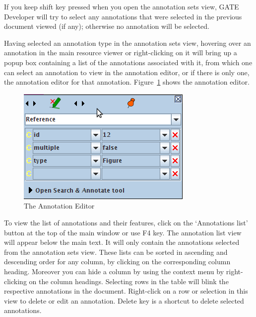 If you keep shift key pressed when you open the annotation sets view, GATE
Developer will try to select any annotations that were selected in the previous
document viewed (if any); otherwise no annotation will be selected.

Having selected an annotation type in the annotation sets view, hovering over an
annotation in the main resource viewer or right-clicking on it will bring up a
popup box containing a list of the annotations associated with it, from which
one can select an annotation to view in the annotation editor, or if there is
only one, the annotation editor for that annotation.
Figure~\ref{fig:annotations-editor} shows the annotation editor.

\begin{figure}[htb]
\begin{center}
\includegraphics[scale=2]{annotations-editor.png}
\end{center}
\caption{The Annotation Editor}
\label{fig:annotations-editor}
\end{figure}



To view the list of annotations and their features, click on the
`Annotations list' button at the top of the main window or use F4 key. The
annotation list view will appear below the main text. It will only contain
the annotations selected from the annotation sets view. These lists can be
sorted in ascending and descending order for any column, by clicking on the
corresponding column heading. Moreover you can hide a column by using the
context menu by right-clicking on the column headings. Selecting rows in the
table will blink the respective annotations in the document. Right-click on
a row or selection in this view to delete or edit an annotation. Delete key
is a shortcut to delete selected annotations.

